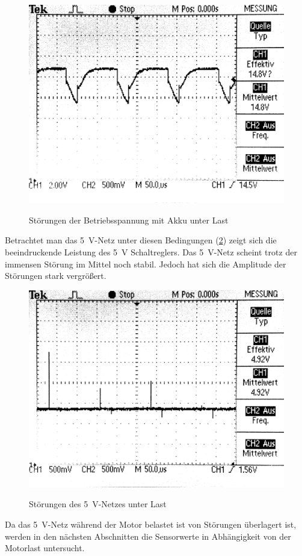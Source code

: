 \begin{figure}[H]
\centering
\includegraphics[width=.8\textwidth]{VCC_AKKU_LAST.png}\\
\caption{Störungen der Betriebsspannung mit Akku unter Last}%
\label{fig:akku_supply}
\end{figure}

Betrachtet man das \SI{5}{\V}-Netz unter diesen Bedingungen (\cref{fig:5V_last}) zeigt sich die beeindruckende Leistung des \SI{5}{\V} Schaltreglers.
Das \SI{5}{\V}-Netz scheint trotz der immensen Störung im Mittel noch stabil. Jedoch hat sich die Amplitude der Störungen
stark vergrößert.

\begin{figure}[H]
\centering
\includegraphics[width=.8\textwidth]{5V_LAST.png}\\
\caption{Störungen des \SI{5}{\V}-Netzes unter Last}%
\label{fig:5V_last}
\end{figure}


Da das \SI{5}{\V}-Netz während der Motor belastet ist von Störungen überlagert ist, werden in den nächsten Abschnitten die Sensorwerte in Ab\-hän\-gig\-keit von der Motorlast untersucht.


